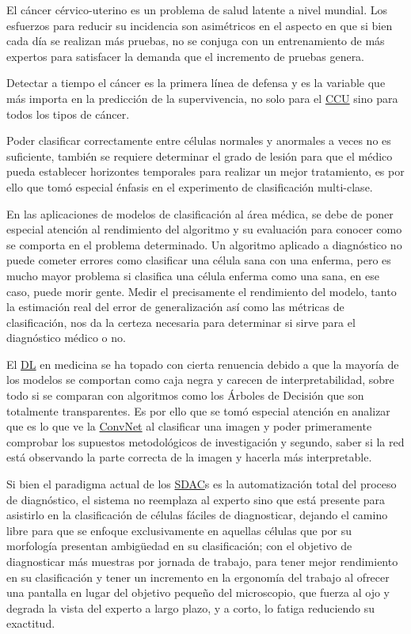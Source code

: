 El cáncer cérvico-uterino es un problema de salud latente a nivel mundial. Los
esfuerzos para reducir su incidencia son asimétricos en el aspecto en que si
bien cada día se realizan más pruebas, no se conjuga con un entrenamiento de más
expertos para satisfacer la demanda que el incremento de pruebas genera.

Detectar a tiempo el cáncer es la primera línea de defensa y es la variable que
más importa en la predicción de la supervivencia, no solo para el
\hyperlink{abbr}{CCU} sino para todos los tipos de cáncer.

Poder clasificar correctamente entre células normales y anormales a veces no
es suficiente, también se requiere determinar el grado de lesión para que el
médico pueda establecer horizontes temporales para realizar un mejor
tratamiento, es por ello que tomó especial énfasis en el experimento de
clasificación multi-clase.

En las aplicaciones de modelos de clasificación al área médica, se debe de poner
especial atención al rendimiento del algoritmo y su evaluación para conocer como
se comporta en el problema determinado. Un algoritmo aplicado a diagnóstico no
puede cometer errores como clasificar una célula sana con una enferma, pero es
mucho mayor problema si clasifica una célula enferma como una sana, en ese caso,
puede morir gente. Medir el precisamente el rendimiento del modelo, tanto la
estimación real del error de generalización así como las métricas de
clasificación, nos da la certeza necesaria para determinar si sirve para el
diagnóstico médico o no.

El \hyperlink{abbr}{DL} en medicina se ha topado con cierta renuencia debido a
que la mayoría de los modelos se comportan como caja negra y carecen de
interpretabilidad, sobre todo si se comparan con algoritmos como los Árboles de
Decisión que son totalmente transparentes. Es por ello que se tomó especial
atención en analizar que es lo que ve la \hyperlink{abbr}{ConvNet} al clasificar
una imagen y poder primeramente comprobar los supuestos metodológicos de
investigación y segundo, saber si la red está observando la parte correcta de la
imagen y hacerla más interpretable.

Si bien el paradigma actual de los \hyperlink{abbr}{SDAC}s es la automatización
total del proceso de diagnóstico, el sistema no reemplaza al experto sino que
está presente para asistirlo en la clasificación de células fáciles de
diagnosticar, dejando el camino libre para que se enfoque exclusivamente en
aquellas células que por su morfología presentan ambigüedad en su clasificación;
con el objetivo de diagnosticar más muestras por jornada de trabajo, para tener
mejor rendimiento en su clasificación y tener un incremento en la ergonomía del
trabajo al ofrecer una pantalla en lugar del objetivo pequeño del microscopio,
que fuerza al ojo y degrada la vista del experto a largo plazo, y a corto, lo
fatiga reduciendo su exactitud.

